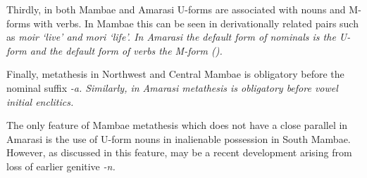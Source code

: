 Thirdly, in both Mambae and Amarasi U-forms are associated
with nouns and M-forms with verbs.
In Mambae this can be seen in derivationally
related pairs such as \it{moir} `live' and \it{mori} `life'.
In Amarasi the default form of nominals is the U-form
and the default form of verbs the M-form ().

Finally, metathesis in Northwest and Central Mambae
is obligatory before the nominal suffix \it{-a}.
Similarly, in Amarasi metathesis is obligatory before
vowel initial enclitics.

The only feature of Mambae metathesis which does
not have a close parallel in Amarasi is the use
of U-form nouns in inalienable possession in South Mambae.
However, as discussed in  this feature,
may be a recent development arising from loss
of earlier genitive \it{-n}.